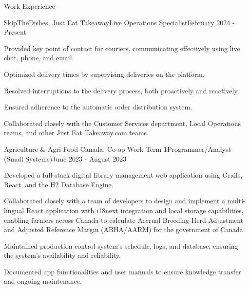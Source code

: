 \documentclass{article}
\newlength{\tabin}
\newlength{\secsep}
\newcommand{\lineunder}{\vspace*{-8pt} \\ \hspace*{-6pt} \hrulefill \\ \vspace*{-15pt}}
\newenvironment{tabbedsection}[1]{
    \begin{list}{}{
        \setlength{\itemsep}{0pt}
        \setlength{\labelsep}{0pt}
        \setlength{\labelwidth}{0pt}
        \setlength{\leftmargin}{\tabin}
        \setlength{\rightmargin}{\tabin}
        \setlength{\listparindent}{0pt}
        \setlength{\parsep}{0pt}
        \setlength{\parskip}{0pt}
        \setlength{\partopsep}{0pt}
        \setlength{\topsep}{#1}
    }
        \item[]
        }{
    \end{list}}
\newenvironment{resume_section}[1]{
    \filbreak
    \vspace{2\secsep}
    \textsc{\large#1}
    \lineunder
    \begin{tabbedsection}{\secsep}
    }{\end{tabbedsection}}
\newenvironment{subitems}{
    \renewcommand{\labelitemi}{-}
    \begin{itemize}
        \setlength{\labelsep}{1em}
        }{
    \end{itemize}}
\newenvironment{resume_employer}[4]{
    \vspace{\secsep}
    \begin{minipage}[t]{0.75\linewidth}
        \textbf{#1}\\
        \small #2
    \end{minipage}%
    \begin{minipage}[t]{0.25\linewidth}
        \hfill \footnotesize #4
    \end{minipage}
    \vspace{0.1em}\\
    \begin{tabbedsection}{0pt}
        \begin{subitems}
        }{\end{subitems}
    \end{tabbedsection}}
\begin{document}
    \begin{resume_section}{Work Experience}

        \begin{resume_employer}{SkipTheDishes, Just Eat Takeaway}{Live Operations Specialist}{}{February 2024 - Present}
            \item Provided key point of contact for couriers, communicating effectively using live chat, phone, and email.

            \item Optimized delivery times by supervising deliveries on the platform.

            \item Resolved interruptions to the delivery process, both proactively and reactively.

            \item Ensured adherence to the automatic order distribution system.

            \item Collaborated closely with the Customer Services department, Local Operations teams, and other Just Eat Takeaway.com teams.
        \end{resume_employer}


        \begin{resume_employer}{Agriculture \& Agri-Food Canada, Co-op Work Term 1}{Programmer/Analyst (Small Systems)}{}{June 2023 - August 2023}
            \item Developed a full-stack digital library management web application using Grails, React, and the H2 Database Engine.

            \item Collaborated closely with a team of developers to design and implement a multi-lingual React
            application with i18next integration and local storage capabilities, enabling farmers across Canada to calculate Accrual Breeding Herd Adjustment and Adjusted Reference Margin (ABHA/AARM) for the government of Canada.

            \item Maintained production control system's schedule, logs, and database, ensuring the system's
            availability and reliability.

            \item Documented app functionalities and user manuals to ensure knowledge transfer and ongoing maintenance.
        \end{resume_employer}


\end{resume_section}
\end{document}
